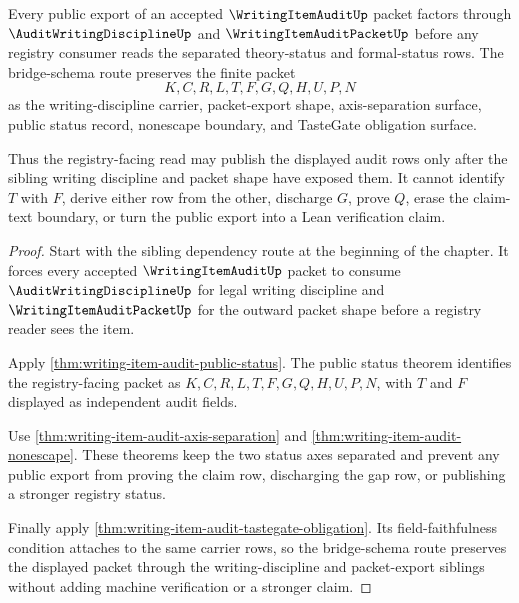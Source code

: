 \begin{theorem}
\label{thm:writing-item-audit-bridge-schema-route}
Every public export of an accepted $\WritingItemAuditUp$ packet factors through $\AuditWritingDisciplineUp$ and $\WritingItemAuditPacketUp$ before any registry consumer reads the separated theory-status and formal-status rows. The bridge-schema route preserves the finite packet
$$
K,C,R,L,T,F,G,Q,H,U,P,N
$$
as the writing-discipline carrier, packet-export shape, axis-separation surface, public status record, nonescape boundary, and TasteGate obligation surface.

Thus the registry-facing read may publish the displayed audit rows only after the sibling writing discipline and packet shape have exposed them. It cannot identify $T$ with $F$, derive either row from the other, discharge $G$, prove $Q$, erase the claim-text boundary, or turn the public export into a Lean verification claim.
\end{theorem}
\begin{proof}
Start with the sibling dependency route at the beginning of the chapter. It forces every accepted $\WritingItemAuditUp$ packet to consume $\AuditWritingDisciplineUp$ for legal writing discipline and $\WritingItemAuditPacketUp$ for the outward packet shape before a registry reader sees the item.

Apply \autoref{thm:writing-item-audit-public-status}. The public status theorem identifies the registry-facing packet as $K,C,R,L,T,F,G,Q,H,U,P,N$, with $T$ and $F$ displayed as independent audit fields.

Use \autoref{thm:writing-item-audit-axis-separation} and \autoref{thm:writing-item-audit-nonescape}. These theorems keep the two status axes separated and prevent any public export from proving the claim row, discharging the gap row, or publishing a stronger registry status.

Finally apply \autoref{thm:writing-item-audit-tastegate-obligation}. Its field-faithfulness condition attaches to the same carrier rows, so the bridge-schema route preserves the displayed packet through the writing-discipline and packet-export siblings without adding machine verification or a stronger claim.
\end{proof}



